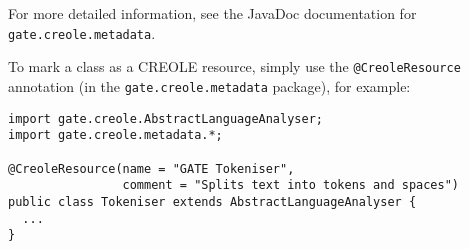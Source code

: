 For more detailed information, see the
JavaDoc documentation for {\tt gate.creole.metadata}.


To mark a class as a CREOLE resource, simply use the \verb|@CreoleResource|
annotation (in the {\tt gate.creole.metadata} package), for example:

\begin{lstlisting}
import gate.creole.AbstractLanguageAnalyser;
import gate.creole.metadata.*;

@CreoleResource(name = "GATE Tokeniser",
                comment = "Splits text into tokens and spaces")
public class Tokeniser extends AbstractLanguageAnalyser {
  ...
}
\end{lstlisting}


